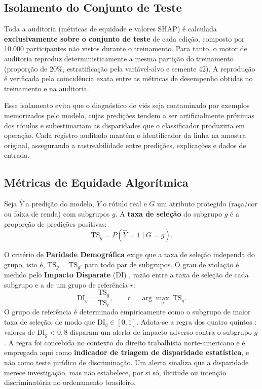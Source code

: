 \subsection{Isolamento do Conjunto de Teste}

Toda a auditoria (métricas de equidade e valores SHAP) é calculada \textbf{exclusivamente sobre o conjunto de teste} de cada edição, composto por 10.000 participantes não vistos durante o treinamento. Para tanto, o motor de auditoria reproduz deterministicamente a mesma partição do treinamento (proporção de 20\%, estratificação pela variável-alvo e semente 42). A reprodução é verificada pela coincidência exata entre as métricas de desempenho obtidas no treinamento e na auditoria.

Esse isolamento evita que o diagnóstico de viés seja contaminado por exemplos memorizados pelo modelo, cujas predições tendem a ser artificialmente próximas dos rótulos e subestimariam as disparidades que o classificador produziria em operação. Cada registro auditado mantém o identificador da linha na amostra original, assegurando a rastreabilidade entre predições, explicações e dados de entrada.

\subsection{Métricas de Equidade Algorítmica}
\label{sec:metricas_equidade}

Seja $\hat{Y}$ a predição do modelo, $Y$ o rótulo real e $G$ um atributo protegido (raça/cor ou faixa de renda) com subgrupos $g$. A \textbf{taxa de seleção} do subgrupo $g$ é a proporção de predições positivas:
\begin{equation}
\mathrm{TS}_g = P(\hat{Y} = 1 \mid G = g).
\label{eq:ts}
\end{equation}

O critério de \textbf{Paridade Demográfica} exige que a taxa de seleção independa do grupo, isto é, $\mathrm{TS}_g = \mathrm{TS}_{g'}$ para todo par de subgrupos. O grau de violação é medido pelo \textbf{Impacto Disparate} (DI) \cite{feldman2015certifying}, razão entre a taxa de seleção de cada subgrupo e a de um grupo de referência $r$:
\begin{equation}
\mathrm{DI}_g = \frac{\mathrm{TS}_g}{\mathrm{TS}_r}, \qquad r = \arg\max_{g}\ \mathrm{TS}_g.
\label{eq:di}
\end{equation}
O grupo de referência é determinado empiricamente como o subgrupo de maior taxa de seleção, de modo que $\mathrm{DI}_g \in [0, 1]$. Adota-se a regra dos quatro quintos \cite{eeoc1978uniform}: valores de $\mathrm{DI}_g < 0{,}8$ disparam um alerta de impacto adverso contra o subgrupo $g$. A regra foi concebida no contexto do direito trabalhista norte-americano e é empregada aqui como \textbf{indicador de triagem de disparidade estatística}, e não como teste jurídico de discriminação. Um alerta sinaliza que a disparidade merece investigação, mas não estabelece, por si só, ilicitude ou intenção discriminatória no ordenamento brasileiro.

